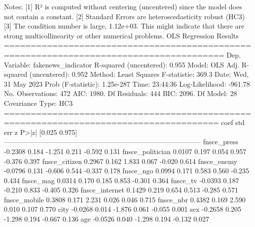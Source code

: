 Notes:
[1] R² is computed without centering (uncentered) since the model does not contain a constant.
[2] Standard Errors are heteroscedasticity robust (HC3)
[3] The condition number is large, 1.12e+03. This might indicate that there are
strong multicollinearity or other numerical problems.                                 OLS Regression Results                                
=======================================================================================
Dep. Variable:     fakenews_indicator   R-squared (uncentered):                   0.955
Model:                            OLS   Adj. R-squared (uncentered):              0.952
Method:                 Least Squares   F-statistic:                              369.3
Date:                Wed, 31 May 2023   Prob (F-statistic):                   1.25e-287
Time:                        23:44:36   Log-Likelihood:                         -961.78
No. Observations:                 472   AIC:                                      1980.
Df Residuals:                     444   BIC:                                      2096.
Df Model:                          28                                                  
Covariance Type:                  HC3                                                  
======================================================================================
                         coef    std err          z      P>|z|      [0.025      0.975]
--------------------------------------------------------------------------------------
fnsce_press           -0.2308      0.184     -1.251      0.211      -0.592       0.131
fnsce_politician       0.0107      0.197      0.054      0.957      -0.376       0.397
fnsce_citizen          0.2967      0.162      1.833      0.067      -0.020       0.614
fnsce_enemy           -0.0796      0.131     -0.606      0.544      -0.337       0.178
fnsce_ngo              0.0994      0.171      0.583      0.560      -0.235       0.434
fnsce_mag              0.0314      0.170      0.185      0.853      -0.301       0.364
fnsce_tv              -0.0393      0.187     -0.210      0.833      -0.405       0.326
fnsce_internet         0.1429      0.219      0.654      0.513      -0.285       0.571
fnsce_mobile           0.3808      0.171      2.231      0.026       0.046       0.715
fnsce_nbr              0.4382      0.169      2.590      0.010       0.107       0.770
city                  -0.0268      0.014     -1.876      0.061      -0.055       0.001
sex                   -0.2658      0.205     -1.298      0.194      -0.667       0.136
age                   -0.0526      0.040     -1.298      0.194      -0.132       0.027
